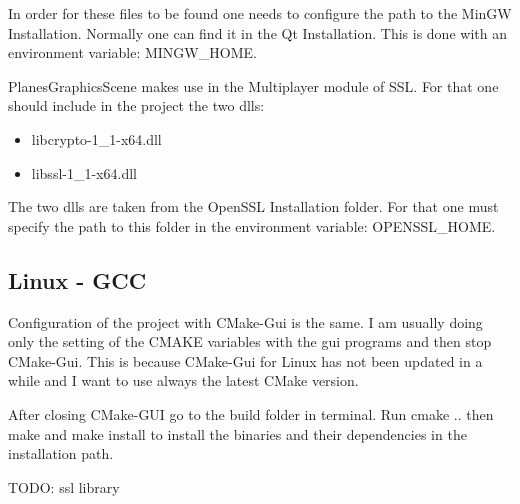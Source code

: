 In order for these files to be found one needs to configure the path to the MinGW Installation. Normally one can find it in the Qt Installation.
This is done with an environment variable: MINGW\_HOME.

PlanesGraphicsScene makes use in the Multiplayer module of SSL. For that one should include in the project the two dlls:

\begin{itemize}
	\item libcrypto-1\_1-x64.dll
	\item libssl-1\_1-x64.dll
\end{itemize}

The two dlls are taken from the OpenSSL Installation folder. For that one must specify the path to this folder in the environment variable: OPENSSL\_HOME.

\subsection {Linux - GCC}

Configuration of the project with CMake-Gui is the same. I am usually doing only the setting of the CMAKE variables with the gui programs and then stop CMake-Gui. This is because CMake-Gui for Linux has not been updated in a while and I want to use always the latest CMake version. 

After closing CMake-GUI go to the build folder in terminal. Run cmake .. then make and make install to install the binaries and their dependencies in the installation path.

TODO: ssl library